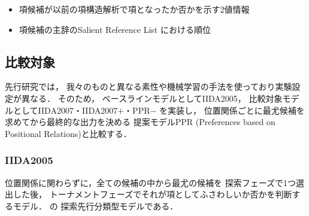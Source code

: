 \documentclass[japanese]{jnlp_1.4}
\newcommand{\newcite}[1]{}
\begin{document}
\begin{itemize}
共起尺度には自己相互情報量\cite{Hindle:1990:ACL}を用いた．
\[
PMI(\langle v, c\rangle , n) = \log \frac{P(\langle v, c, n \rangle)}{P(\langle v, c\rangle ) P(n)}
\]
なお，スムージングは行わなかった．
自己相互情報量の算出には次の2つのコーパスを用い，
2つの値をそれぞれ二値素性として\footnote{値が$x$以下のときのみ発火する素性．実際には，$x$を$-4$から$4$まで$0.1$刻みで変化させた素性を用いた．}用いた．\\[0.5\Cvs]
\textbf{NEWS:}
1995年を除く1991年から2003年までの毎日新聞約1,800万文．
MeCab0.98\footnote{\url{https://code.google.com/p/mecab/}}で形態素解析を行い
CaboCha0.60pre4\footnote{\url{https://code.google.com/p/cabocha/}}で係り受け解析を行った．
辞書はNAIST Japanese Dictionary 0.6.3\footnote{\url{http://sourceforge.jp/projects/naist-jdic/}}を用いた．
約2,700万対の$\langle$動詞, 格助詞, 名詞$\rangle$の組を抽出した\footnote{動詞が約3万種，名詞が約32万種で，ユニーク数は約700万組．}．\\[0.5\Cvs]
\textbf{WEB:}
\newcite{Kawahara:2006:LREC}がウェブから収集した日本語約5億文．
JUMAN\footnote{\url{http://nlp.ist.i.kyoto-u.ac.jp/index.php?JUMAN}}で形態素解析を行い，
KNP\footnote{\url{http://nlp.ist.i.kyoto-u.ac.jp/index.php?KNP}}で係り受け解析を行なっている．
KNPの項構造解析結果から約53億対の$\langle$述語, 格助詞, 項$\rangle$の組を抽出した
\footnote{動詞が約8億種，項が約2.8億種で，ユニーク数は約1.6億組．}．

\item 項候補が以前の項構造解析で項となったか否かを示す2値情報
\item 項候補の主辞のSalient Reference List \cite{Nariyama:2002:TMI}における順位
\end{itemize}


\subsection{比較対象}

先行研究では，
我々のものと異なる素性や機械学習の手法を使っており実験設定が異なる．
そのため，
ベースラインモデルとしてIIDA2005，
比較対象モデルとしてIIDA2007・IIDA2007$+$・PPR$-$
を実装し，
位置関係ごとに最尤候補を求めてから最終的な出力を決める
提案モデルPPR (Preferences based on Positional Relations)と比較する．

\subsubsection{IIDA2005} 

位置関係に関わらずに，全ての候補の中から最尤の候補を
探索フェーズで1つ選出した後，
トーナメントフェーズでそれが項としてふさわしいか否かを判断するモデル．
\cite{Iida:2005:TALIP}の
探索先行分類型モデルである．
\end{document}
